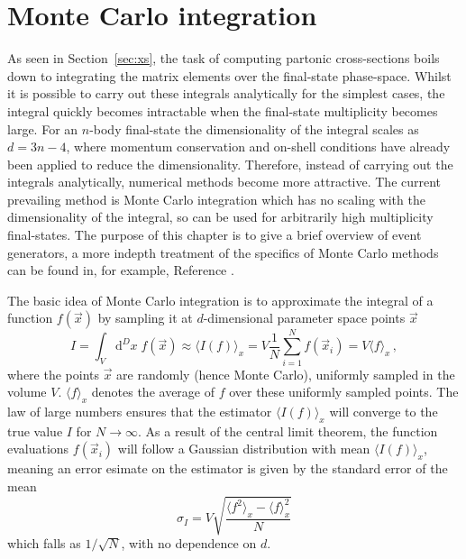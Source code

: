\documentclass[main.tex]{subfiles}
\begin{document}
    \section{Monte Carlo integration}\label{sec:MC_integration}
    As seen in Section~\ref{sec:xs}, the task of
    computing partonic cross-sections boils down
    to integrating the matrix elements over the
    final-state phase-space. Whilst it is possible to
    carry out these integrals analytically for the simplest
    cases, the integral quickly becomes intractable when the
    final-state multiplicity becomes large. For an $n$-body
    final-state the dimensionality of the integral scales as $d=3n-4$,
    where momentum conservation and on-shell conditions
    have already been applied to reduce the dimensionality.
    Therefore, instead of carrying out the integrals analytically,
    numerical methods become more attractive. The current
    prevailing method is Monte Carlo integration which
    has no scaling with the dimensionality of the integral,
    so can be used for arbitrarily high multiplicity final-states.
    The purpose of this chapter is to give a brief overview
    of event generators, a more indepth treatment of the
    specifics of Monte Carlo methods can be found in, for example, Reference
    \cite{James:1980yn}.

    The basic idea of Monte Carlo integration is to approximate
    the integral of a function $f(\vec{x})$ by sampling it
    at $d$-dimensional parameter space points $\vec{x}$
    \begin{equation}\label{eqn:MC_integration}
        I = \int_{V} \mathrm{d}^{D}x \; f(\vec{x}) \approx \langle I(f) \rangle_{x} = V \dfrac{1}{N} \sum_{i=1}^{N} f(\vec{x}_{i}) = V \langle f \rangle_{x} \, ,
    \end{equation}
    where the points $\vec{x}$ are randomly (hence Monte Carlo),
    uniformly sampled in the volume $V$. $\langle f \rangle_{x}$
    denotes the average of $f$ over these uniformly sampled
    points. The law of large numbers ensures that the
    estimator $\langle I(f) \rangle_{x}$ will converge to
    the true value $I$ for $N \rightarrow \infty$. As a
    result of the central limit theorem, the function evaluations
    $f(\vec{x}_{i})$ will follow a Gaussian distribution with
    mean $\langle I(f) \rangle_{x}$,
    meaning an error esimate on the estimator is given by
    the standard error of the mean
    \begin{equation}\label{eqn:MC_error}
        \sigma_{I} = V \sqrt{\dfrac{\langle f^{2} \rangle_{x} - \langle f \rangle_{x}^{2}}{N}}
    \end{equation}
    which falls as $1/\sqrt{N}$, with no dependence
    on $d$.
\end{document}
